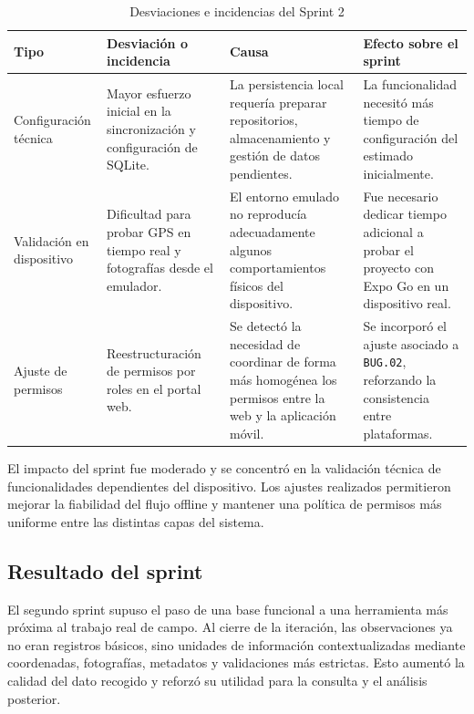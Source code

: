 \begin{table}[H]
\centering
\caption{Desviaciones e incidencias del Sprint 2}
\label{tab:desviaciones_sprint2}
\small
\setlength{\tabcolsep}{4pt}
\renewcommand{\arraystretch}{1.22}
\begin{tabularx}{\textwidth}{|>{\raggedright\arraybackslash}p{2.6cm}|>{\raggedright\arraybackslash}X|>{\raggedright\arraybackslash}X|>{\raggedright\arraybackslash}X|}
\hline
\textbf{Tipo} & \textbf{Desviación o incidencia} & \textbf{Causa} & \textbf{Efecto sobre el sprint} \\
\hline
Configuración técnica & Mayor esfuerzo inicial en la sincronización y configuración de SQLite. & La persistencia local requería preparar repositorios, almacenamiento y gestión de datos pendientes. & La funcionalidad necesitó más tiempo de configuración del estimado inicialmente. \\
\hline
Validación en dispositivo & Dificultad para probar GPS en tiempo real y fotografías desde el emulador. & El entorno emulado no reproducía adecuadamente algunos comportamientos físicos del dispositivo. & Fue necesario dedicar tiempo adicional a probar el proyecto con Expo Go en un dispositivo real. \\
\hline
Ajuste de permisos & Reestructuración de permisos por roles en el portal web. & Se detectó la necesidad de coordinar de forma más homogénea los permisos entre la web y la aplicación móvil. & Se incorporó el ajuste asociado a \texttt{BUG.02}, reforzando la consistencia entre plataformas. \\
\hline
\end{tabularx}
\end{table}

El impacto del sprint fue moderado y se concentró en la validación técnica de
funcionalidades dependientes del dispositivo. Los ajustes realizados permitieron
mejorar la fiabilidad del flujo offline y mantener una política de permisos más
uniforme entre las distintas capas del sistema.

\subsection{Resultado del sprint}

El segundo sprint supuso el paso de una base funcional a una herramienta más próxima al trabajo real de campo. Al cierre de la iteración, las observaciones ya no eran registros básicos, sino unidades de información contextualizadas mediante coordenadas, fotografías, metadatos y validaciones más estrictas. Esto aumentó la calidad del dato recogido y reforzó su utilidad para la consulta y el análisis posterior.

